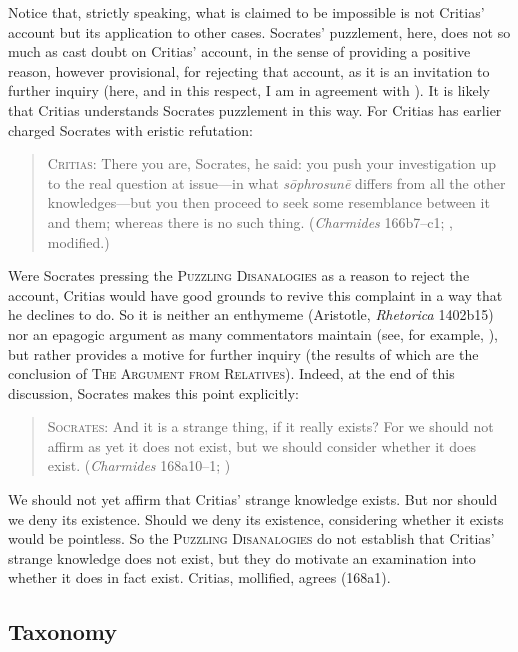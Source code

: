 Notice that, strictly speaking, what is claimed to be impossible is not Critias' account but its application to other cases. Socrates' puzzlement, here, does not so much as cast doubt on Critias' account, in the sense of providing a positive reason, however provisional, for rejecting that account, as it is an invitation to further inquiry (here, and in this respect, I am in agreement with \citealt{Politis:2008nv}). It is likely that Critias understands Socrates puzzlement in this way. For Critias has earlier charged Socrates with eristic refutation:
\begin{quote}
	\textsc{Critias}: There you are, Socrates, he said: you push your investigation up to the real question at issue—in what \emph{sōphrosunē} differs from all the other knowledges—but you then proceed to seek some resemblance between it and them; whereas there is no such thing. (\emph{Charmides} 166b7–c1; \citealt[53]{Lamb:1927qw}, modified.)
\end{quote}	
Were Socrates pressing the \textsc{Puzzling Disanalogies} as a reason to reject the account, Critias would have good grounds to revive this complaint in a way that he declines to do. So it is neither an enthymeme (Aristotle, \emph{Rhetorica} 1402b15) nor an epagogic argument as many commentators maintain (see, for example, \citealt[41]{Robinson:1941yb}), but rather provides a motive for further inquiry (the results of which are the conclusion of \textsc{The Argument from Relatives}). Indeed, at the end of this discussion, Socrates makes this point explicitly:
\begin{quote}
	\textsc{Socrates}: And it is a strange thing, if it really exists? For we should not affirm as yet it does not exist, but we should consider whether it does exist. (\emph{Charmides} 168a10–1; \citealt[61]{Lamb:1927qw})
\end{quote}
We should not yet affirm that Critias' strange knowledge exists. But nor should we deny its existence. Should we deny its existence, considering whether it exists would be pointless. So the \textsc{Puzzling Disanalogies} do not establish that Critias' strange knowledge does not exist, but they do motivate an examination into whether it does in fact exist. Critias, mollified, agrees (168a1).

\subsection{Taxonomy} %
\label{sub:taxonomy}

